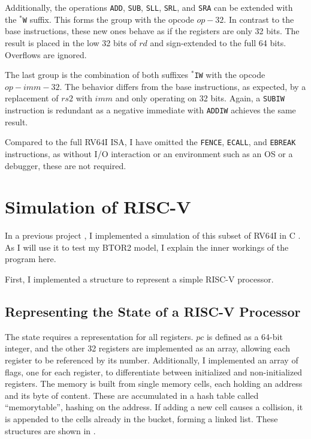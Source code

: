 Additionally, the operations \texttt{ADD}, \texttt{SUB},
\texttt{SLL}, \texttt{SRL}, and \texttt{SRA} can be extended with the
\texttt{$^*$W} suffix. This forms the group with the opcode $op-32$.
In contrast to the base instructions, these new ones behave as if the
registers are only 32 bits. The result is placed in the low 32 bits
of $rd$ and sign-extended to the full 64 bits. Overflows are ignored.

The last group is the combination of both suffixes \texttt{$^*$IW}
with the opcode $op-imm-32$. The behavior differs from the base
instructions, as expected, by a replacement of $rs2$ with $imm$ and
only operating on 32 bits. Again, a \texttt{SUBIW} instruction is
redundant as a negative immediate with \texttt{ADDIW} achieves the
same result.

Compared to the full RV64I ISA, I have omitted the \texttt{FENCE},
\texttt{ECALL}, and \texttt{EBREAK} instructions, as without I/O
interaction or an environment such as an OS or a debugger, these are
not required.

\section{Simulation of RISC-V}\label{sec:simulation}
In a previous project , I implemented a
simulation of this subset of RV64I in C \cite{repoSim}. As I will use
it to test my BTOR2 model, I explain the inner workings of the
program here.

First, I implemented a structure to represent a simple RISC-V
processor.

\subsection{Representing the State of a RISC-V Processor}
The state requires a representation for all registers. $pc$ is
defined as a 64-bit integer, and the other 32 registers are
implemented as an array, allowing each register to be referenced by
its number. Additionally, I implemented an array of flags, one for
each register, to differentiate between initialized and
non-initialized registers. The memory is built from single memory
cells, each holding an address and its byte of content. These are
accumulated in a hash table called \enquote{memorytable}, hashing on
the address. If adding a new cell causes a collision, it is appended
to the cells already in the bucket, forming a linked list. These
structures are shown in .

